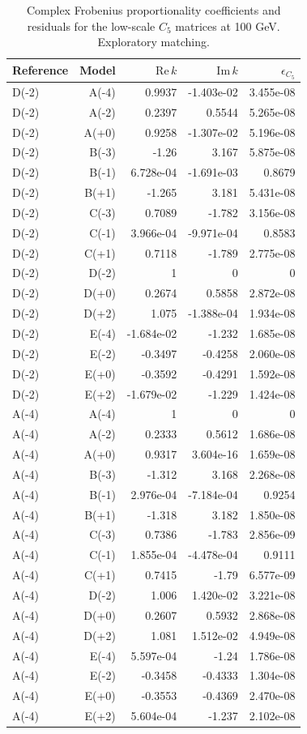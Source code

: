 \begin{table}[htbp]
\centering
\small
\setlength{\tabcolsep}{3.4pt}
\begin{tabular}{lrrrr}
\hline
Reference & Model & $\mathrm{Re}\,k$ & $\mathrm{Im}\,k$ & $\epsilon_{C_5}$ \\
\hline
D(-2) & A(-4) & 0.9937 & -1.403e-02 & 3.455e-08 \\
D(-2) & A(-2) & 0.2397 & 0.5544 & 5.265e-08 \\
D(-2) & A(+0) & 0.9258 & -1.307e-02 & 5.196e-08 \\
D(-2) & B(-3) & -1.26 & 3.167 & 5.875e-08 \\
D(-2) & B(-1) & 6.728e-04 & -1.691e-03 & 0.8679 \\
D(-2) & B(+1) & -1.265 & 3.181 & 5.431e-08 \\
D(-2) & C(-3) & 0.7089 & -1.782 & 3.156e-08 \\
D(-2) & C(-1) & 3.966e-04 & -9.971e-04 & 0.8583 \\
D(-2) & C(+1) & 0.7118 & -1.789 & 2.775e-08 \\
D(-2) & D(-2) & 1 & 0 & 0 \\
D(-2) & D(+0) & 0.2674 & 0.5858 & 2.872e-08 \\
D(-2) & D(+2) & 1.075 & -1.388e-04 & 1.934e-08 \\
D(-2) & E(-4) & -1.684e-02 & -1.232 & 1.685e-08 \\
D(-2) & E(-2) & -0.3497 & -0.4258 & 2.060e-08 \\
D(-2) & E(+0) & -0.3592 & -0.4291 & 1.592e-08 \\
D(-2) & E(+2) & -1.679e-02 & -1.229 & 1.424e-08 \\
A(-4) & A(-4) & 1 & 0 & 0 \\
A(-4) & A(-2) & 0.2333 & 0.5612 & 1.686e-08 \\
A(-4) & A(+0) & 0.9317 & 3.604e-16 & 1.659e-08 \\
A(-4) & B(-3) & -1.312 & 3.168 & 2.268e-08 \\
A(-4) & B(-1) & 2.976e-04 & -7.184e-04 & 0.9254 \\
A(-4) & B(+1) & -1.318 & 3.182 & 1.850e-08 \\
A(-4) & C(-3) & 0.7386 & -1.783 & 2.856e-09 \\
A(-4) & C(-1) & 1.855e-04 & -4.478e-04 & 0.9111 \\
A(-4) & C(+1) & 0.7415 & -1.79 & 6.577e-09 \\
A(-4) & D(-2) & 1.006 & 1.420e-02 & 3.221e-08 \\
A(-4) & D(+0) & 0.2607 & 0.5932 & 2.868e-08 \\
A(-4) & D(+2) & 1.081 & 1.512e-02 & 4.949e-08 \\
A(-4) & E(-4) & 5.597e-04 & -1.24 & 1.786e-08 \\
A(-4) & E(-2) & -0.3458 & -0.4333 & 1.304e-08 \\
A(-4) & E(+0) & -0.3553 & -0.4369 & 2.470e-08 \\
A(-4) & E(+2) & 5.604e-04 & -1.237 & 2.102e-08 \\
\hline
\end{tabular}
\caption{Complex Frobenius proportionality coefficients and residuals for the low-scale $C_5$ matrices at 100 GeV. Exploratory matching.}
\label{tab:generalised_b4}
\end{table}
